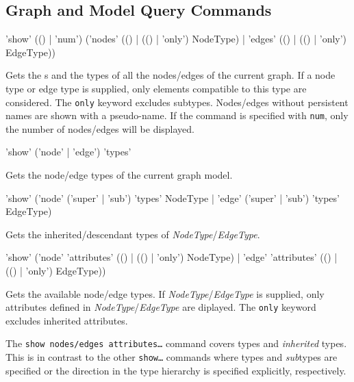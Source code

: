   
\subsection{Graph and Model Query Commands}

\begin{rail}
  'show' (() | 'num') ('nodes' (() | (() | 'only') NodeType) | 'edges' (() | (() | 'only') EdgeType))
\end{rail}
Gets the s and the types of all the nodes/edges of the current graph. 
If a node type or edge type is supplied, only elements compatible to this type are considered. 
The \texttt{only} keyword excludes subtypes. Nodes/edges without persistent names are shown with a pseudo-name.
If the command is specified with \texttt{num}, only the number of nodes/edges will be displayed.

\begin{rail}
  'show' ('node' | 'edge') 'types'
\end{rail}
Gets the node/edge types of the current graph model.

\begin{rail}
'show' ('node' ('super' | 'sub') 'types' NodeType | 'edge' ('super' | 'sub') 'types' EdgeType)
\end{rail}
Gets the inherited/descendant types of \emph{NodeType}/\emph{EdgeType}.

\begin{rail}
  'show' ('node' 'attributes' (() | (() | 'only') NodeType) | 'edge' 'attributes' (() | (() | 'only') EdgeType))
\end{rail}
Gets the available node/edge  types.
If \emph{NodeType}/\emph{EdgeType} is supplied, only attributes defined in \emph{NodeType}/\emph{EdgeType} are diplayed.
The \texttt{only} keyword excludes inherited attributes.\\
\begin{note}
The \texttt{show nodes/edges attributes\dots} command covers types and \emph{inherited} types.
This is in contrast to the other \texttt{show\dots} commands where types and \emph{sub}types are specified or the direction in the type hierarchy is specified explicitly, respectively.
\end{note}

